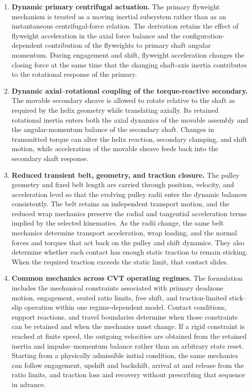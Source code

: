 \documentclass[11pt]{report}
\numberwithin{equation}{section}
\begin{document}
\begin{enumerate}

\item \textbf{Dynamic primary centrifugal actuation.}
The primary flyweight mechanism is treated as a moving inertial subsystem rather
than as an instantaneous centrifugal-force relation. The derivation retains the
effect of flyweight acceleration in the axial force balance and the
configuration-dependent contribution of the flyweights to primary shaft angular
momentum. During engagement and shift, flyweight acceleration changes the
closing force at the same time that the changing shaft-axis inertia contributes
to the rotational response of the primary.

\item \textbf{Dynamic axial--rotational coupling of the torque-reactive
secondary.}
The movable secondary sheave is allowed to rotate relative to the shaft as
required by the helix geometry while translating axially. Its retained
rotational inertia enters both the axial dynamics of the movable assembly and
the angular-momentum balance of the secondary shaft. Changes in transmitted
torque can alter the helix reaction, secondary clamping, and shift motion, while
acceleration of the movable sheave feeds back into the secondary shaft response.

\item \textbf{Reduced transient belt, geometry, and traction closure.}
The pulley geometry and fixed belt length are carried through position,
velocity, and acceleration level so that the evolving pulley radii enter the
dynamic balances consistently. The belt retains an independent transport
motion, and the reduced wrap mechanics preserve the radial and tangential
acceleration terms implied by the selected kinematics. As the radii change, the
same belt mechanics determine transport acceleration, wrap loading, and the
normal forces and torques that act back on the pulley and shift dynamics. They
also determine whether each contact has enough static traction to remain
sticking. When the required traction exceeds the static limit, that contact
slides.

\item \textbf{Common mechanics across CVT operating regimes.}
The formulation includes the mechanical constraints associated with primary
deadzone motion, engagement, seated ratio limits, free shift, and
traction-limited stick--slip operation within one regime-dependent model.
Contact conditions, support reactions, and travel boundaries determine when those
constraints can be retained and when the mechanics must change. If a rigid
constraint is reached at finite speed, the outgoing velocities are obtained
from the retained inertia and impulse--momentum balance rather than an arbitrary
state reset. Starting from a physically admissible initial condition, the same
mechanics can follow engagement, upshift and backshift, arrival at and release
from the ratio limits, and traction loss and recovery without prescribing that
sequence in advance.

\end{enumerate}
\end{document}
